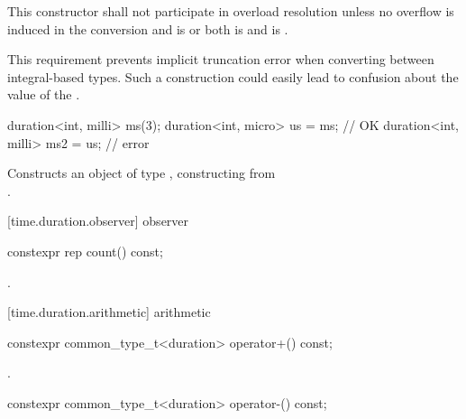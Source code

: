 \begin{itemdescr}
\pnum
\remarks This constructor shall not participate in overload resolution unless
no overflow is induced in the conversion and
 is  or both
 is  and
 is . \begin{note} This
requirement prevents implicit truncation error when converting between
integral-based  types. Such a construction could easily lead to
confusion about the value of the . \end{note}
\begin{example}
\begin{codeblock}
duration<int, milli> ms(3);
duration<int, micro> us = ms;       // OK
duration<int, milli> ms2 = us;      // error
\end{codeblock}
\end{example}

\pnum
\effects Constructs an object of type , constructing  from\\
.
\end{itemdescr}

[time.duration.observer]{ observer}

%
\begin{itemdecl}
constexpr rep count() const;
\end{itemdecl}

\begin{itemdescr}
\pnum
\returns {}.
\end{itemdescr}

[time.duration.arithmetic]{ arithmetic}

%
\begin{itemdecl}
constexpr common_type_t<duration> operator+() const;
\end{itemdecl}

\begin{itemdescr}
\pnum
\returns {}.
\end{itemdescr}

%
\begin{itemdecl}
constexpr common_type_t<duration> operator-() const;
\end{itemdecl}

